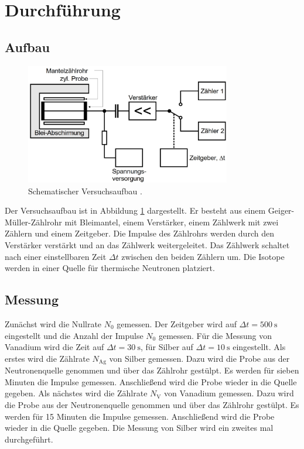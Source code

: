 \section{Durchführung}
\label{sec:Durchführung}

\subsection{Aufbau}
\label{sec:Aufbau}

\begin{figure}
    \centering
    \includegraphics[width=0.8\textwidth]{img/Aufbau.jpg}
    \caption{Schematischer Versuchsaufbau \cite{V702}.}
    \label{fig:Aufbau}
\end{figure}

Der Versuchsaufbau ist in Abbildung \ref{fig:Aufbau} dargestellt.
Er besteht aus einem Geiger-Müller-Zählrohr mit Bleimantel, einem Verstärker, einem Zählwerk mit zwei Zählern und einem Zeitgeber.
Die Impulse des Zählrohrs werden durch den Verstärker verstärkt und an das Zählwerk weitergeleitet.
Das Zählwerk schaltet nach einer einstellbaren Zeit $\Delta t$ zwischen den beiden Zählern um.
Die Isotope werden in einer Quelle für thermische Neutronen platziert.

\subsection{Messung}
\label{sec:Messung}

Zunächst wird die Nullrate $N_0$ gemessen. Der Zeitgeber wird auf $\Delta t = \SI{500}{\second}$ eingestellt und die Anzahl der Impulse $N_0$ gemessen.
Für die Messung von Vanadium wird die Zeit auf $\Delta t = \SI{30}{\second}$, für Silber auf $\Delta t = \SI{10}{\second}$ eingestellt.
Als erstes wird die Zählrate $N_{\text{Ag}}$ von Silber gemessen. Dazu wird die Probe aus der Neutronenquelle genommen und über das Zählrohr gestülpt.
Es werden für sieben Minuten die Impulse gemessen. Anschließend wird die Probe wieder in die Quelle gegeben.
Als nächstes wird die Zählrate $N_{\text{V}}$ von Vanadium gemessen. Dazu wird die Probe aus der Neutronenquelle genommen und über das Zählrohr gestülpt.
Es werden für 15 Minuten die Impulse gemessen. Anschließend wird die Probe wieder in die Quelle gegeben.
Die Messung von Silber wird ein zweites mal durchgeführt.